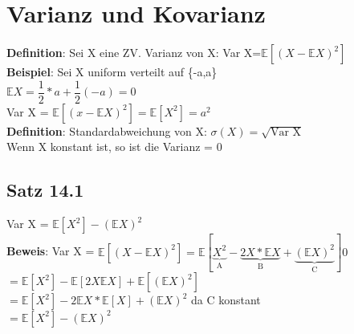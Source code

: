 \chapter{Varianz und Kovarianz}
\textbf{Definition}: Sei X eine ZV. Varianz von X: \hspace{1cm} Var X=$\mathds{E}[(X-\mathds{E}X)^2]$\medskip\\
\textbf{Beispiel}: 
Sei X uniform verteilt auf \{-a,a\}\smallskip\\
$\mathds{E}X=\dfrac{1}{2}*a+\dfrac{1}{2}(-a)=0$\smallskip\\
Var X = $\mathds{E}[(x-\mathds{E}X)^2]=\mathds{E}[X^2]=a^2$\medskip\\
\textbf{Definition}: Standardabweichung von X: $\sigma(X)=\sqrt{\text{Var X}}$\medskip\\
Wenn X konstant ist, so ist die Varianz = 0
\section{Satz 14.1} Var X = $\mathds{E}[X^2]-(\mathds{E}X)^2$\medskip\\
\textbf{Beweis}: Var X = $\mathds{E}[(X-\mathds{E}X)^2] = \mathds{E}[\underbrace{X^2}_\text{A}-\underbrace{2X*\mathds{E}X}_\text{B}+\underbrace{(\mathds{E}X)^2}_\text{C}]0$\smallskip\\
$=\mathds{E}[X^2]-\mathds{E}[2X\mathds{E}X]+\mathds{E}[(\mathds{E}X)^2]$\smallskip\\
$=\mathds{E}[X^2]-2 \mathds{E}X*\mathds{E}[X]+(\mathds{E}X)^2$ da C konstant\smallskip\\
$=\mathds{E}[X^2]-(\mathds{E}X)^2$
